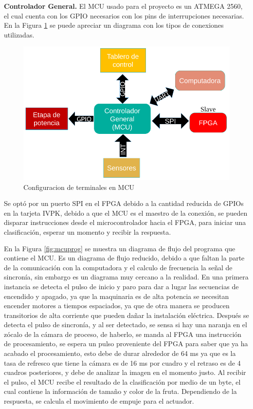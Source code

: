 \documentclass[twoside,spanish,ESP,MSc]{plantillaLabUPV}
\theoremstyle{definition}
\begin{document}
\checkmark\textbf{Controlador General.} El MCU usado para el proyecto es un ATMEGA 2560, el cual cuenta con los GPIO necesarios con los pins de interrupciones necesarias. En la Figura \ref{fig:pins} se puede apreciar un diagrama con los tipos de conexiones utilizadas.

\begin{figure}
	\centering
	\includegraphics[width=0.7\linewidth]{edrawimas/pins}
	\caption{Configuracion de terminales en MCU}
	\label{fig:pins}
\end{figure}

Se optó por un puerto SPI en el FPGA debido a la cantidad reducida de GPIOs en la tarjeta IVPK, debido a que el MCU es el maestro de la conexión, se pueden disparar instrucciones desde el microcontrolador hacia el FPGA, para iniciar una clasificación, esperar un momento y recibir la respuesta.

En la Figura \ref{fig:mcuprog} se muestra un diagrama de flujo del programa que contiene el MCU. Es un diagrama de flujo reducido, debido a que faltan la parte de la comunicación con la computadora y el calculo de frecuencia la señal de sincronía, sin embargo es un diagrama muy cercano a la realidad. En una primera instancia se detecta el pulso de inicio y paro para dar a lugar las secuencias de encendido y apagado, ya que la maquinaria es de alta potencia se necesitan encender motores a tiempos espaciados, ya que de otra manera se producen transitorios de alta corriente que pueden dañar la instalación eléctrica. Después se detecta el pulso de sincronía, y al ser detectado, se sensa si hay una naranja en el zócalo de la cámara de proceso, de haberlo, se manda al FPGA una instrucción de procesamiento, se espera un pulso proveniente del FPGA para saber que ya ha acabado el procesamiento, esto debe de durar alrededor de 64 ms ya que es la tasa de refresco que tiene la cámara es de 16 ms por cuadro y el retraso es de 4 cuadros posteriores, y debe de analizar la imagen en el momento justo. Al recibir el pulso, el MCU recibe el resultado de la clasificación por medio de un byte, el cual contiene la información de tamaño y color de la fruta. Dependiendo de la respuesta, se calcula el movimiento de empuje para el actuador.
\end{document}
